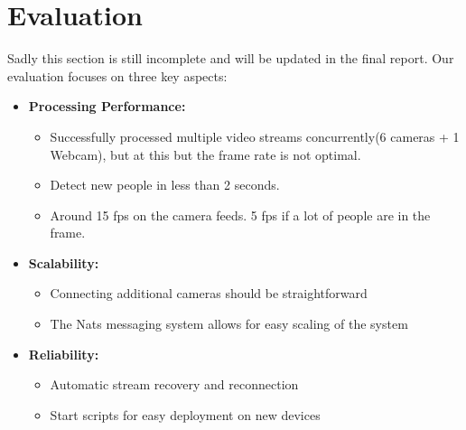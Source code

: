\documentclass[conference]{IEEEtran}
\begin{document}
\section{Evaluation}
\label{sec:evaluation}
Sadly this section is still incomplete and will be updated in the final report.
Our evaluation focuses on three key aspects:

\begin{itemize}
      \item \textbf{Processing Performance:}
            \begin{itemize}
                  \item Successfully processed multiple video streams concurrently(6 cameras + 1 Webcam), but at this but the frame rate is not optimal.
                  \item Detect new people in less than 2 seconds.
                  \item Around 15 fps on the camera feeds. 5 fps if a lot of people are in the frame.
            \end{itemize}

      \item \textbf{Scalability:}
            \begin{itemize}
                  \item Connecting additional cameras should be straightforward
                  \item The Nats messaging system allows for easy scaling of the system
            \end{itemize}
      \item \textbf{Reliability:}
            \begin{itemize}
                  \item Automatic stream recovery and reconnection
                  \item Start scripts for easy deployment on new devices
            \end{itemize}
\end{itemize}
\end{document}
